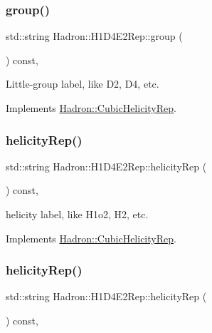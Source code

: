 \subsubsection{\texorpdfstring{group()}{group()}\hspace{0.1cm}{\footnotesize\ttfamily [5/5]}}
{\footnotesize\ttfamily std\+::string Hadron\+::\+H1\+D4\+E2\+Rep\+::group (\begin{DoxyParamCaption}{ }\end{DoxyParamCaption}) const\hspace{0.3cm}{\ttfamily [inline]}, {\ttfamily [virtual]}}

Little-\/group label, like D2, D4, etc. 

Implements \mbox{\hyperlink{structHadron_1_1CubicHelicityRep_a101a7d76cd8ccdad0f272db44b766113}{Hadron\+::\+Cubic\+Helicity\+Rep}}.

\mbox{\label{structHadron_1_1H1D4E2Rep_a2c58d7ff3d9ef7f2adedc4e0a12db6cb}} 
\subsubsection{\texorpdfstring{helicityRep()}{helicityRep()}\hspace{0.1cm}{\footnotesize\ttfamily [1/3]}}
{\footnotesize\ttfamily std\+::string Hadron\+::\+H1\+D4\+E2\+Rep\+::helicity\+Rep (\begin{DoxyParamCaption}{ }\end{DoxyParamCaption}) const\hspace{0.3cm}{\ttfamily [inline]}, {\ttfamily [virtual]}}

helicity label, like H1o2, H2, etc. 

Implements \mbox{\hyperlink{structHadron_1_1CubicHelicityRep_af1096946b7470edf0a55451cc662f231}{Hadron\+::\+Cubic\+Helicity\+Rep}}.

\mbox{\label{structHadron_1_1H1D4E2Rep_a2c58d7ff3d9ef7f2adedc4e0a12db6cb}} 
\subsubsection{\texorpdfstring{helicityRep()}{helicityRep()}\hspace{0.1cm}{\footnotesize\ttfamily [2/3]}}
{\footnotesize\ttfamily std\+::string Hadron\+::\+H1\+D4\+E2\+Rep\+::helicity\+Rep (\begin{DoxyParamCaption}{ }\end{DoxyParamCaption}) const\hspace{0.3cm}{\ttfamily [inline]}, {\ttfamily [virtual]}}

